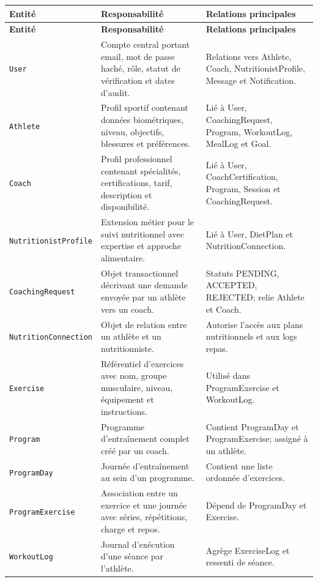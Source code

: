 \begin{longtable}{|p{3.5cm}|p{6cm}|p{6cm}|}
\hline
\rowcolor[HTML]{D5E8D4}
\textbf{Entité} & \textbf{Responsabilité} & \textbf{Relations principales} \\ \hline
\endfirsthead
\hline
\rowcolor[HTML]{D5E8D4}
\textbf{Entité} & \textbf{Responsabilité} & \textbf{Relations principales} \\ \hline
\endhead
\texttt{User} & Compte central portant email, mot de passe haché, rôle, statut de vérification et dates d’audit. & Relations vers Athlete, Coach, NutritionistProfile, Message et Notification. \\ \hline
\texttt{Athlete} & Profil sportif contenant données biométriques, niveau, objectifs, blessures et préférences. & Lié à User, CoachingRequest, Program, WorkoutLog, MealLog et Goal. \\ \hline
\texttt{Coach} & Profil professionnel contenant spécialités, certifications, tarif, description et disponibilité. & Lié à User, CoachCertification, Program, Session et CoachingRequest. \\ \hline
\texttt{NutritionistProfile} & Extension métier pour le suivi nutritionnel avec expertise et approche alimentaire. & Lié à User, DietPlan et NutritionConnection. \\ \hline
\texttt{CoachingRequest} & Objet transactionnel décrivant une demande envoyée par un athlète vers un coach. & Statuts PENDING, ACCEPTED, REJECTED; relie Athlete et Coach. \\ \hline
\texttt{NutritionConnection} & Objet de relation entre un athlète et un nutritionniste. & Autorise l’accès aux plans nutritionnels et aux logs repas. \\ \hline
\texttt{Exercise} & Référentiel d’exercices avec nom, groupe musculaire, niveau, équipement et instructions. & Utilisé dans ProgramExercise et WorkoutLog. \\ \hline
\texttt{Program} & Programme d’entraînement complet créé par un coach. & Contient ProgramDay et ProgramExercise; assigné à un athlète. \\ \hline
\texttt{ProgramDay} & Journée d’entraînement au sein d’un programme. & Contient une liste ordonnée d’exercices. \\ \hline
\texttt{ProgramExercise} & Association entre un exercice et une journée avec séries, répétitions, charge et repos. & Dépend de ProgramDay et Exercise. \\ \hline
\texttt{WorkoutLog} & Journal d’exécution d’une séance par l’athlète. & Agrège ExerciseLog et ressenti de séance. \\ \hline

\end{longtable}
